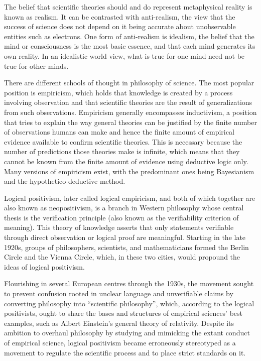 \documentclass[
]{article}
\begin{document}
The belief that scientific theories should and do represent metaphysical
reality is known as realism. It can be contrasted with anti-realism, the
view that the success of science does not depend on it being accurate
about unobservable entities such as electrons. One form of anti-realism
is idealism, the belief that the mind or consciousness is the most basic
essence, and that each mind generates its own reality. In an idealistic
world view, what is true for one mind need not be true for other minds.

There are different schools of thought in philosophy of science. The
most popular position is empiricism, which holds that knowledge is
created by a process involving observation and that scientific theories
are the result of generalizations from such observations. Empiricism
generally encompasses inductivism, a position that tries to explain the
way general theories can be justified by the finite number of
observations humans can make and hence the finite amount of empirical
evidence available to confirm scientific theories. This is necessary
because the number of predictions those theories make is infinite, which
means that they cannot be known from the finite amount of evidence using
deductive logic only. Many versions of empiricism exist, with the
predominant ones being Bayesianism and the hypothetico-deductive method.

Logical positivism, later called logical empiricism, and both of which
together are also known as neopositivism, is a branch in Western
philosophy whose central thesis is the verification principle (also
known as the verifiability criterion of meaning). This theory of
knowledge asserts that only statements verifiable through direct
observation or logical proof are meaningful. Starting in the late 1920s,
groups of philosophers, scientists, and mathematicians formed the Berlin
Circle and the Vienna Circle, which, in these two cities, would propound
the ideas of logical positivism.

Flourishing in several European centres through the 1930s, the movement
sought to prevent confusion rooted in unclear language and unverifiable
claims by converting philosophy into ``scientific philosophy'', which,
according to the logical positivists, ought to share the bases and
structures of empirical sciences' best examples, such as Albert
Einstein's general theory of relativity. Despite its ambition to
overhaul philosophy by studying and mimicking the extant conduct of
empirical science, logical positivism became erroneously stereotyped as
a movement to regulate the scientific process and to place strict
standards on it.
\end{document}
